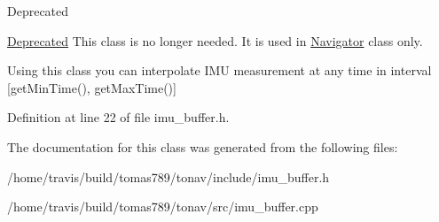 \begin{DoxyRefDesc}{Deprecated}
\item[\hyperlink{deprecated__deprecated000001}{Deprecated}]This class is no longer needed. It is used in \hyperlink{class_navigator}{Navigator} class only.\end{DoxyRefDesc}


Using this class you can interpolate I\-M\-U measurement at any time in interval \mbox{[}get\-Min\-Time(), get\-Max\-Time()\mbox{]} 

Definition at line 22 of file imu\-\_\-buffer.\-h.



The documentation for this class was generated from the following files\-:\begin{DoxyCompactItemize}
\item 
/home/travis/build/tomas789/tonav/include/imu\-\_\-buffer.\-h\item 
/home/travis/build/tomas789/tonav/src/imu\-\_\-buffer.\-cpp\end{DoxyCompactItemize}
